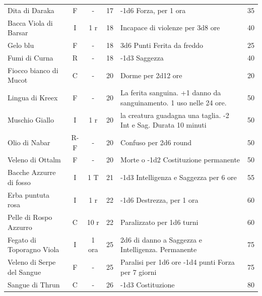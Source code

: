 \begin{tabularx}{\linewidth}{lcccXc}
	Dita di Daraka\index{Dita di Daraka} & F& - & 17& -1d6 Forza, per 1 ora & 35\\

 \rowcolor{gray!20}Bacca Viola di Barsar\index{Bacca Viola di Barsar}& I& 1 r& 18& Incapace di violenze per 3d8 ore& 40 \\

	Gelo blu \index{Gelo blu} & F& -& 18& 3d6 Punti Ferita da freddo& 25\\

 \rowcolor{gray!20}Fumi di Curna\index{Fumi di Curna} & R& - & 18& -1d3 Saggezza & 40\\

	Fiocco bianco di Mucot \index{Fiocco bianco di Mucot}& C& - & 20& Dorme per 2d12 ore& 20\\

 \rowcolor{gray!20}Lingua di Kreex \index{Lingua di Kreex} & F& - & 20& La ferita sanguina. +1 danno da sanguinamento. 1 uso nelle 24 ore. & 50 \\

	Muschio Giallo \index{Muschio Giallo}& I& 1 r& 20& la creatura guadagna una taglia. -2 Int e Sag. Durata 10 minuti& 50\\

 \rowcolor{gray!20}Olio di Nabar \index{Olio di Nabar}& R-F& - & 20& Confuso per 2d6 round& 50\\

	Veleno di Ottalm\index{Veleno di Ottalm}& F& - & 20& Morte o -1d2 Costituzione permanente& 50\\

 \rowcolor{gray!20}Bacche Azzurre di fosso \index{Bacche Azzurre di fosso}& I& 1 T& 21& -1d3 Intelligenza e Saggezza per 6 ore& 55\\

	Erba puntuta rosa \index{Erba puntuta rosa}& I& 1 r& 22& -1d6 Destrezza, per 1 ora& 60\\

 \rowcolor{gray!20}Pelle di Rospo Azzurro \index{Pelle di Rospo Azzurro}& C& 10 r & 22& Paralizzato per 1d6 turni& 60\\

	Fegato di Toporagno Viola \index{Fegato di Toporagno Viola} & I& 1 ora& 25& 2d6 di danno a Saggezza e Intelligenza. Permanente & 75 \\

 \rowcolor{gray!20}Veleno di Serpe del Sangue \index{Veleno di Serpe del Sangue} & F& - & 25& Paralisi per 1d6 ore -1d4 punti Forza per 7 giorni & 75\\

	Sangue di Thrun \index{Sangue di Thrun} & C& - & 26& -1d3 Costituzione & 80\\

\end{tabularx}

